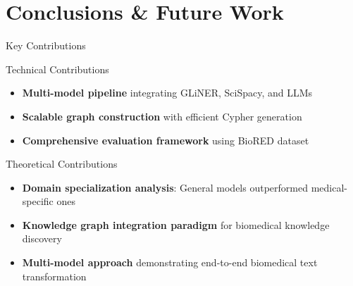 \documentclass[aspectratio=169, 11pt]{beamer}
\begin{document}
\section{Conclusions \& Future Work}

\begin{frame}{Key Contributions}
    \vspace{0.2cm}
    \begin{block}{Technical Contributions}
        \begin{itemize}
            \setlength{\itemsep}{0.2cm}
            \item \textbf{Multi-model pipeline} integrating GLiNER, SciSpacy, and LLMs
            \item \textbf{Scalable graph construction} with efficient Cypher generation
            \item \textbf{Comprehensive evaluation framework} using BioRED dataset
        \end{itemize}
    \end{block}
    
    \vspace{0.3cm}
    \begin{block}{Theoretical Contributions}
        \begin{itemize}
            \setlength{\itemsep}{0.2cm}
            \item \textbf{Domain specialization analysis}: General models outperformed medical-specific ones
            \item \textbf{Knowledge graph integration paradigm} for biomedical knowledge discovery
            \item \textbf{Multi-model approach} demonstrating end-to-end biomedical text transformation
        \end{itemize}
    \end{block}
\end{frame}
\end{document}
